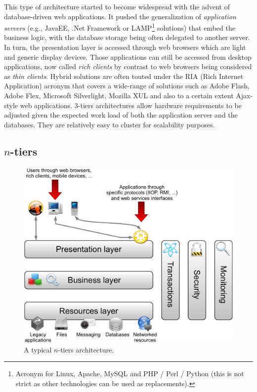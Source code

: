This type of architecture started to become widespread with the advent of database-driven web applications. It pushed the generalization of \emph{application servers} (e.g., JavaEE, .Net Framework or LAMP\footnote{Acronym for Linux, Apache, MySQL and PHP / Perl / Python (this is not strict as other technologies can be used as replacements).} solutions) that embed the business logic, with the database storage being often delegated to another server. In turn, the presentation layer is accessed through web browsers which are light and generic display devices. Those applications can still be accessed from desktop applications, now called \emph{rich clients} by contrast to web browsers being considered as \emph{thin clients}. Hybrid solutions are often touted under the RIA (Rich Internet Application) acronym that covers a wide-range of solutions such as Adobe Flash, Adobe Flex, Microsoft Silverlight, Mozilla XUL and also to a certain extent Ajax-style web applications. 3-tiers architectures allow hardware requirements to be adjusted given the expected work load of both the application server and the databases. They are relatively easy to cluster for scalability purposes.\\


\subsection{$n$-tiers}


\begin{figure}[htbp]
    \centering
    \includegraphics[width=\textwidth]{content/web-services/ntiers-middleware}
    \caption{A typical $n$-tiers architecture.}
    \label{fig:ntiers-middleware}
\end{figure}

